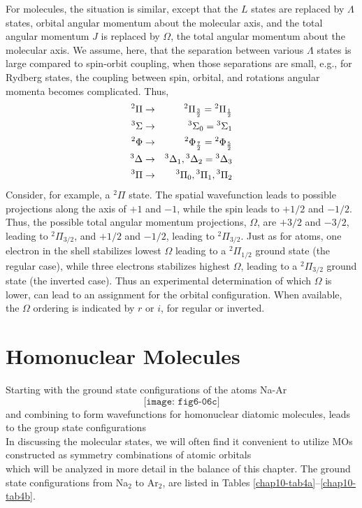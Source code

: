 For molecules, the situation is similar, except that the $L$ 
states are replaced by $\Lambda$ states, orbital angular momentum
about the molecular axis, and the total angular momentum 
$J$ is replaced by $\Omega$, the total angular
momentum about the molecular axis.  We assume, here, that the 
separation between various $\Lambda$ states is large compared to 
spin-orbit coupling, when those separations are small, e.g., for 
Rydberg states, the coupling between spin, orbital, and rotations 
angular momenta becomes complicated.  Thus,
\begin{eqnarray}
{^2\Pi} &\rightarrow& {^2\Pi}_{{3 \over 2}} = {^2\Pi}_{{1 \over 2}}\cr
{^3\Sigma} &\rightarrow& {^3\Sigma}_0 = {^3\Sigma}_1\cr
{^2\Phi} &\rightarrow& {^2\Phi}_{{7 \over 2}} = {^2\Phi}_{{5 \over 2}}\cr
{^3\Delta} &\rightarrow& {^3\Delta}_1 , {^3\Delta}_2 = {^3\Delta}_3\cr
{^3\Pi} &\rightarrow& {^3\Pi}_0 , {^3\Pi}_1 , {^3\Pi}_2
\end{eqnarray}
Consider, for example, a ${^2\Pi}$ state.  The spatial wavefunction
leads to possible projections along the axis of $+1$ and $-1$, while
the spin leads to $+1/2$ and $-1/2$.  Thus, the possible total angular
momentum projections, $\Omega$, are $+3/2$ and $-3/2$, leading to
$^2\Pi_{3/2}$, and $+1/2$ and $-1/2$, leading to $^2\Pi_{3/2}$.  Just
as for atoms, one electron in the shell stabilizes lowest $\Omega$
leading to a ${^2\Pi}_{1/2}$ ground state (the regular case), while
three electrons stabilizes highest $\Omega$, leading to a
${^2\Pi}_{3/2}$ ground state (the inverted case).  Thus an
experimental determination of which $\Omega$ is lower, can lead to an
assignment for the orbital configuration.  When available, the
$\Omega$ ordering is indicated by $r$ or $i$, for regular or inverted.

\section{Homonuclear Molecules}

Starting with the ground state configurations of the atoms Na-Ar
\begin{equation}
\texttt{[image: fig6-06c]}
\end{equation}
and combining to form wavefunctions for homonuclear diatomic 
molecules, leads to the group state configurations
\begin{equation}
\end{equation}
In discussing the molecular states, we will often find it convenient 
to utilize MOs constructed as symmetry combinations of 
atomic orbitals
\begin{equation}
\end{equation}
which will be analyzed in more detail in the balance of this chapter.  
The ground state configurations from Na$_2$ to Ar$_2$, are listed in 
Tables \ref{chap10-tab4a}--\ref{chap10-tab4b}.

